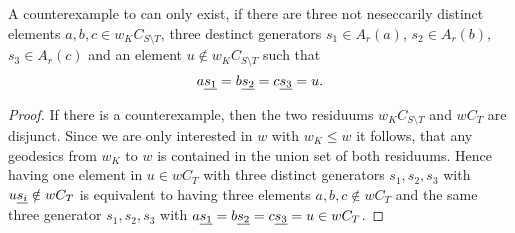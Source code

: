 \begin{lemm}
\label{counterexample-simplification2}
A counterexample to  can only exist, if there are three not
neseccarily distinct elements $a,b,c \in w_K C_{S \setminus T}$, three
destinct generators $s_1 \in A_r(a)$, $s_2 \in A_r(b)$, $s_3 \in A_r(c)$ and an
element $u \notin w_K C_{S \setminus T}$ such that
$$ a \underline{s_1} = b \underline{s_2} = c \underline{s_3} = u. $$

\begin{proof}
If there is a counterexample, then the two residuums $w_K C_{S \setminus T}$ and
$w C_T$ are disjunct. Since we are only interested in $w$ with $w_K \leq w$
it follows, that any geodesics from $w_K$ to $w$ is contained in the union set
of both residuums. Hence having one element in $u \in w C_T$ with three distinct
generators $s_1,s_2,s_3$ with $u \underline{s_i} \notin w C_T$ is equivalent to having
three elements $a,b,c \notin w C_T$ and the same three generator $s_1,s_2,s_3$
with $a \underline{s_1} = b \underline{s_2} = c \underline{s_3} = u \in w C_T$.
\end{proof}
\end{lemm}